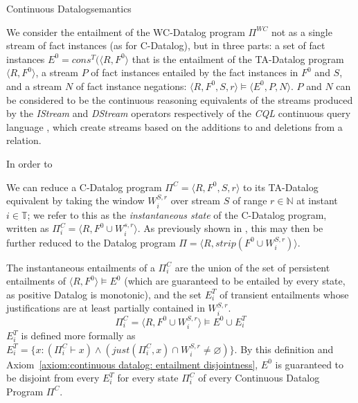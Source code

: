 \begin{nestedsection}{Continuous Datalog}{semantics}
\begin{definition}
We consider the entailment of the WC-Datalog program $\Pi^{WC}$ not as
a single stream of fact instances (as for C-Datalog), but in three
parts: a set of fact instances $E^0 = cons^T(\langle R, F^0\rangle$
that is the entailment of the TA-Datalog program $\langle R,
F^0\rangle$, a stream $P$ of fact instances entailed by the fact
instances in $F^0$ and $S$, and a stream $N$ of fact instance negations:
$\langle R, F^0, S, r \rangle \models \langle E^0, P, N \rangle$. $P$
and $N$ can be considered to be the continuous reasoning equivalents
of the streams produced by the \emph{IStream} and \emph{DStream}
operators respectively of the \emph{CQL} continuous query language
\citep{CQL}, which create streams based on the additions to and
deletions from a relation.

In order to 

\end{definition}

\begin{definition}
\label{def:continuous datalog: CDPt}

We can reduce a C-Datalog program $\Pi^C = \langle R, F^0, S, r
\rangle$ to its TA-Datalog equivalent by taking the window $W^{S,r}_i$
over stream $S$ of range $r \in \mathbb{N}$ at instant $i \in
\mathbb{T}$; we refer to this as the {\em instantaneous state} of the
C-Datalog program, written as $\Pi^C_i = \langle R, F^0 \cup W^{s,r}_i
\rangle$. As previously shown in , this may then be further reduced to the Datalog
program $\Pi = \langle R, strip(F^0 \cup W^{S,r}_i) \rangle$.

The instantaneous entailments of a $\Pi^C_i$ are the union of the set of
persistent entailments of ${\langle R, F^0 \rangle \vDash E^0}$ (which are
guaranteed to be entailed by every state, as positive Datalog is monotonic),
and the set $E^T_{i}$ of transient entailments whose justifications are at
least partially contained in $W^{S,r}_i$.
\begin{equation*}
\Pi^C_i = \langle R, F^0 \cup W^{S,r}_{i} \rangle \vDash E^0 \cup E^T_{i}
\end{equation*}
$E^T_i$ is defined more formally as
${E^T_{i} = \{ x : \left( \Pi^C_i \vdash x \right) \wedge
\left( just(\Pi^C_i,x) \cap W^{S,r}_i \neq \varnothing \right) \}}$.
By this definition and Axiom~\ref{axiom:continuous datalog: entailment disjointness},
$E^0$ is guaranteed to be disjoint from every $E^T_i$
for every state $\Pi^C_i$ of every Continuous Datalog Program $\Pi^C$.
\end{definition}


\end{nestedsection}
